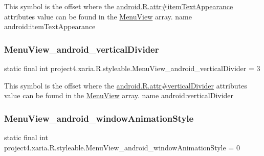 This symbol is the offset where the \hyperlink{}{android.\+R.\+attr\#item\+Text\+Appearance} attribute\textquotesingle{}s value can be found in the \hyperlink{classproject4_1_1xaria_1_1R_1_1styleable_ac1aef922f3c93d63048c893762b0dbda}{Menu\+View} array.  name android\+:item\+Text\+Appearance \mbox{\label{classproject4_1_1xaria_1_1R_1_1styleable_ac550192a3b9eed5ec97313a89b3f93b9}} 
\subsubsection{\texorpdfstring{Menu\+View\+\_\+android\+\_\+vertical\+Divider}{MenuView\_android\_verticalDivider}}
{\footnotesize\ttfamily static final int project4.\+xaria.\+R.\+styleable.\+Menu\+View\+\_\+android\+\_\+vertical\+Divider = 3\hspace{0.3cm}{\ttfamily [static]}}

This symbol is the offset where the \hyperlink{}{android.\+R.\+attr\#vertical\+Divider} attribute\textquotesingle{}s value can be found in the \hyperlink{classproject4_1_1xaria_1_1R_1_1styleable_ac1aef922f3c93d63048c893762b0dbda}{Menu\+View} array.  name android\+:vertical\+Divider \mbox{\label{classproject4_1_1xaria_1_1R_1_1styleable_ab594d20426da891ee4202ce7515875cd}} 
\subsubsection{\texorpdfstring{Menu\+View\+\_\+android\+\_\+window\+Animation\+Style}{MenuView\_android\_windowAnimationStyle}}
{\footnotesize\ttfamily static final int project4.\+xaria.\+R.\+styleable.\+Menu\+View\+\_\+android\+\_\+window\+Animation\+Style = 0\hspace{0.3cm}{\ttfamily [static]}}

